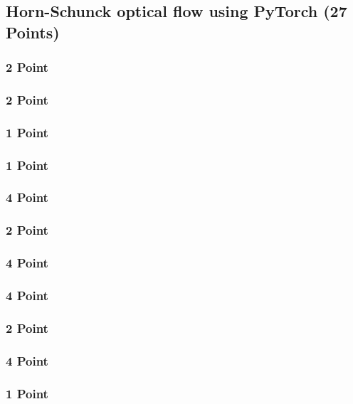 \newif\ifvimbug
\vimbugfalse

\ifvimbug

\fi


\subsection{Horn-Schunck optical flow using PyTorch (27 Points)}
\subsubsection{2 Point}

\subsubsection{2 Point}

\subsubsection{1 Point}

\subsubsection{1 Point}

\subsubsection{4 Point}

\subsubsection{2 Point}

\subsubsection{4 Point}

\subsubsection{4 Point}

\subsubsection{2 Point}

\subsubsection{4 Point}

\subsubsection{1 Point}